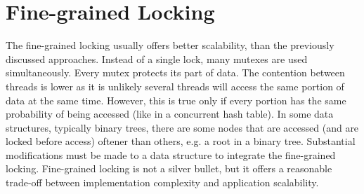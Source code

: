 \section{Fine-grained Locking}

The fine-grained locking usually offers better scalability, than the previously discussed approaches. Instead of a single lock, many mutexes are used simultaneously. Every mutex protects its part of data. The contention between threads is lower as it is unlikely several threads will access the same portion of data at the same time. However, this is true only if every portion has the same probability of being accessed (like in a concurrent hash table). In some data structures, typically binary trees, there are some nodes that are accessed (and are locked before access) oftener than others, e.g. a root in a binary tree. Substantial modifications must be made to a data structure to integrate the fine-grained locking. Fine-grained locking is not a silver bullet, but it offers a reasonable trade-off between implementation complexity and application scalability.


\newcommand{\uitem}[1]{
\item \textbf{#1} \par
}
\newcommand{\aitem}[1]{
\item \textbf{#1} \par
}







